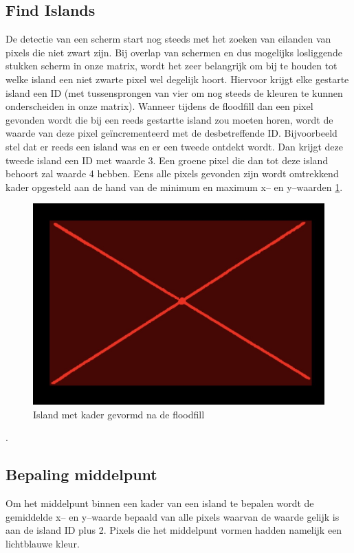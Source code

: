 \subsection{Find Islands}
De detectie van een scherm start nog steeds met het zoeken van eilanden van pixels die niet zwart zijn. Bij overlap van schermen en dus mogelijks losliggende stukken scherm in onze matrix, wordt het zeer belangrijk om bij te houden tot welke island een niet zwarte pixel wel degelijk hoort. Hiervoor krijgt elke gestarte island een ID (met tussensprongen van vier om nog steeds de kleuren te kunnen onderscheiden in onze matrix). Wanneer tijdens de floodfill dan een pixel gevonden wordt die bij een reeds gestartte island zou moeten horen, wordt de waarde van deze pixel geïncrementeerd met de desbetreffende ID. \cite{floodfill} Bijvoorbeeld stel dat er reeds een island was en er een tweede ontdekt wordt. Dan krijgt deze tweede island een ID met waarde 3. Een groene pixel die dan tot deze island behoort zal waarde 4 hebben. Eens alle pixels gevonden zijn wordt omtrekkend kader opgesteld aan de hand van de minimum en maximum x-- en y--waarden \ref{fig:island}.

\begin{figure} [h]
	\center
	\includegraphics[width=\textwidth]{island}
	\caption{Island met kader gevormd na de floodfill}
	\label{fig:island}
\end{figure}.

\subsection{Bepaling middelpunt}
Om het middelpunt binnen een kader van een island te bepalen wordt de gemiddelde x-- en y--waarde bepaald van alle pixels waarvan de waarde gelijk is aan de island ID plus 2. Pixels die het middelpunt vormen hadden namelijk een lichtblauwe kleur.

